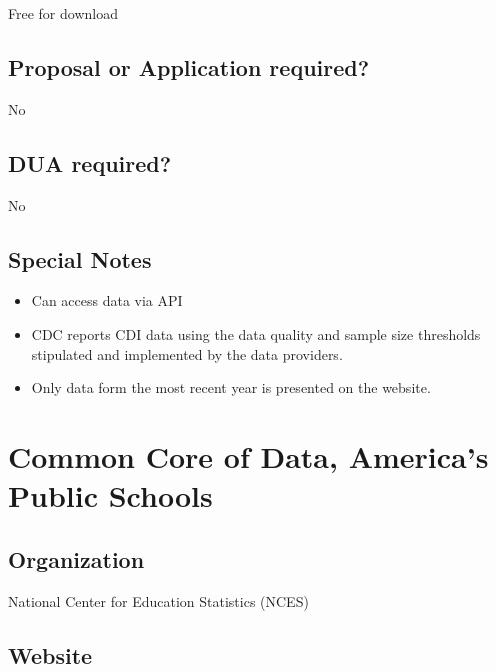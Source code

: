 \documentclass[
]{book}
\providecommand{\tightlist}{%
  \setlength{\itemsep}{0pt}\setlength{\parskip}{0pt}}
\begin{document}
Free for download

\hypertarget{proposal-or-application-required-16}{%
\section{Proposal or Application required?}\label{proposal-or-application-required-16}}

No

\hypertarget{dua-required-16}{%
\section{DUA required?}\label{dua-required-16}}

No

\hypertarget{special-notes-16}{%
\section{Special Notes}\label{special-notes-16}}

\begin{itemize}
\tightlist
\item
  Can access data via API
\item
  CDC reports CDI data using the data quality and sample size thresholds stipulated and implemented by the data providers.
\item
  Only data form the most recent year is presented on the website.
\end{itemize}

\mainmatter

\hypertarget{common-core-of-data-americas-public-schools}{%
\chapter{Common Core of Data, America's Public Schools}\label{common-core-of-data-americas-public-schools}}

\hypertarget{organization-17}{%
\section{Organization}\label{organization-17}}

National Center for Education Statistics (NCES)

\hypertarget{website-17}{%
\section{Website}\label{website-17}}
\end{document}
